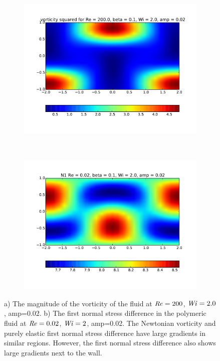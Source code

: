 \documentclass{jfm}
\newcommand\Wi{\mbox{\textit{Wi}}}
\newcommand\Rey{\mbox{\textit{Re}}}  %
\begin{document}
\begin{figure}
    \centering
    \begin{subfigure}[b]{0.48\textwidth}
	\includegraphics[width=\textwidth]{./figures/vorticity_map_Re200_Wi2_amp002}
	\label{fig:pf_N1_map}
    \end{subfigure}
    ~
    \begin{subfigure}[b]{0.48\textwidth}
	\includegraphics[width=\textwidth]{./figures/N1_map_Rey002_Wi2_amp002}
	\label{fig:pf_N1_map}
    \end{subfigure}
	\caption{a) The magnitude of the vorticity of the fluid at $\Rey = 200$, $\Wi = 2.0$, amp=0.02. b) The first normal stress difference in the polymeric fluid at $\Rey = 0.02$, $\Wi = 2$, amp=0.02. The Newtonian vorticity and purely elastic first normal stress difference have large gradients in similar regions. However, the first normal stress difference also shows large gradients next to the wall. }
\end{figure}
\end{document}
